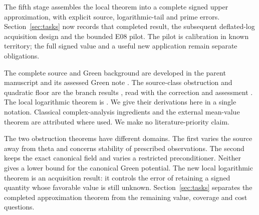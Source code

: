 The fifth stage assembles the local theorem into a complete signed
upper approximation, with explicit source, logarithmic-tail and prime
errors. Section~\ref{sec:tasks} now records that completed result,
the subsequent deflated-log acquisition design and the bounded E08
pilot. The pilot is calibration in known territory; the full signed
value and a useful new application remain separate obligations.

The complete source and Green background are developed in the parent
manuscript and its assessed Green note \cite{OGParent,GreenStripProof}.
The source-class obstruction and quadratic floor are the branch
results \cite{OGConditioning,OGMollifier}, read with the correction and
assessment \cite{OGCorrection,OGAssessment}. The local logarithmic
theorem is \cite{OGBoundaryLog}. We give their derivations here in a
single notation. Classical complex-analysis ingredients and the
external mean-value theorem are attributed where used. We make no
literature-priority claim.

The two obstruction theorems have different domains. The first varies
the source away from theta and concerns stability of prescribed
observations. The second keeps the exact canonical field and varies
a restricted preconditioner. Neither gives a lower bound for the
canonical Green potential. The new local logarithmic theorem is an
acquisition result: it controls the error of retaining a signed
quantity whose favorable value is still unknown. Section~\ref{sec:tasks}
separates the completed approximation theorem from the remaining
value, coverage and cost questions.

